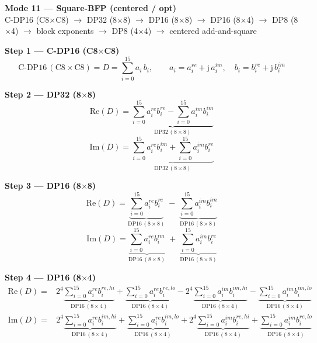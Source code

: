 \documentclass[fleqn]{article}
\newcommand{\DPop}[3]{\mathrm{DP#1}\,(#2\!\times\!#3)}
\begin{document}
\begin{center}
{\LARGE \textbf{Mode 11 --- Square-BFP (centered / opt)}}\\[4pt]
{\large C-DP16 (C8$\times$C8) $\rightarrow$ DP32 (8$\times$8) $\rightarrow$ DP16 (8$\times$8) $\rightarrow$ DP16 (8$\times$4) $\rightarrow$ DP8 (8$\times$4) $\rightarrow$ block exponents $\rightarrow$ DP8 (4$\times$4) $\rightarrow$ centered add-and-square}
\end{center}

\vspace{0.1em}

\textbf{Step 1 --- C-DP16 (C8$\times$C8)}
\[
\text{C-DP16}\,(\mathrm{C8}\!\times\!\mathrm{C8}) = D = \sum_{i=0}^{15} a_i \, b_i, \qquad
a_i = a_i^{re} + \mathrm{j}\,a_i^{im}, \quad
b_i = b_i^{re} + \mathrm{j}\,b_i^{im}
\]

\textbf{Step 2 --- DP32 (8$\times$8)}
\[
\mathrm{Re}(D) = \underbrace{\sum_{i=0}^{15} a_i^{re} b_i^{re}
  - \sum_{i=0}^{15} a_i^{im} b_i^{im}}_{\DPop{32}{8}{8}}
\]
\[
\mathrm{Im}(D) = \underbrace{\sum_{i=0}^{15} a_i^{re} b_i^{im}
  + \sum_{i=0}^{15} a_i^{im} b_i^{re}}_{\DPop{32}{8}{8}}
\]

\textbf{Step 3 --- DP16 (8$\times$8)}
\[
\mathrm{Re}(D) = \underbrace{\sum_{i=0}^{15} a_i^{re} b_i^{re}}_{\DPop{16}{8}{8}}
  \; - \; \underbrace{\sum_{i=0}^{15} a_i^{im} b_i^{im}}_{\DPop{16}{8}{8}}
\]
\[
\mathrm{Im}(D) = \underbrace{\sum_{i=0}^{15} a_i^{re} b_i^{im}}_{\DPop{16}{8}{8}}
  \; + \; \underbrace{\sum_{i=0}^{15} a_i^{im} b_i^{re}}_{\DPop{16}{8}{8}}
\]

\textbf{Step 4 --- DP16 (8$\times$4)}
\begin{align*}
\mathrm{Re}(D) = {}
  & 2^{4} \underbrace{\sum_{i=0}^{15} a_i^{re} b_i^{re,hi}}_{\DPop{16}{8}{4}}
  + \underbrace{\sum_{i=0}^{15} a_i^{re} b_i^{re,lo}}_{\DPop{16}{8}{4}}
  - 2^{4} \underbrace{\sum_{i=0}^{15} a_i^{im} b_i^{im,hi}}_{\DPop{16}{8}{4}}
  - \underbrace{\sum_{i=0}^{15} a_i^{im} b_i^{im,lo}}_{\DPop{16}{8}{4}}
\end{align*}
\begin{align*}
\mathrm{Im}(D) = {}
  & 2^{4} \underbrace{\sum_{i=0}^{15} a_i^{re} b_i^{im,hi}}_{\DPop{16}{8}{4}}
  + \underbrace{\sum_{i=0}^{15} a_i^{re} b_i^{im,lo}}_{\DPop{16}{8}{4}}
  + 2^{4} \underbrace{\sum_{i=0}^{15} a_i^{im} b_i^{re,hi}}_{\DPop{16}{8}{4}}
  + \underbrace{\sum_{i=0}^{15} a_i^{im} b_i^{re,lo}}_{\DPop{16}{8}{4}}
\end{align*}
\end{document}
